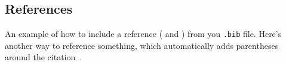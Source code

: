 \documentclass{article}
\begin{document}
\subsection{References} 
An example of how to include a reference (\cite{OpenCV} and \cite{SIFT}) from you \texttt{.bib} file. Here's another way to reference something, which automatically adds parentheses around the citation~\citep{adams1995hitchhiker}.






\nocite{*} 







\pagebreak





\end{document}
